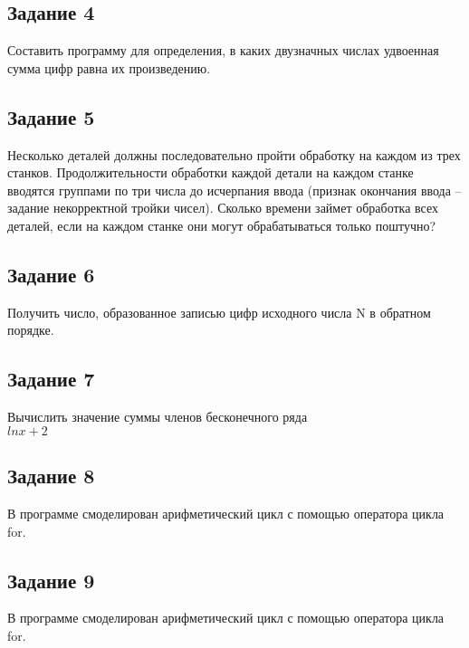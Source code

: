 \documentclass[a4paper,14pt]{extarticle}
\begin{document}
\subsection{Задание 4}
Составить программу для определения, в каких двузначных числах удвоенная сумма цифр равна их произведению. 


\subsection{Задание 5}
Несколько деталей должны последовательно пройти обработку на каждом из трех станков. Продолжительности обработки каждой детали на каждом станке вводятся группами по три числа до исчерпания ввода (признак окончания ввода – задание некорректной тройки чисел). Сколько времени займет обработка всех деталей, если на каждом станке они могут обрабатываться только поштучно? 


\subsection{Задание 6}
Получить число, образованное записью цифр исходного числа N в обратном порядке. 


\subsection{Задание 7}
Вычислить значение суммы членов бесконечного ряда\\
$ln x + 2$


\subsection{Задание 8}
В программе смоделирован арифметический цикл с помощью оператора цикла for. 


\subsection{Задание 9}
В программе смоделирован арифметический цикл с помощью оператора цикла for. 

\end{document}
